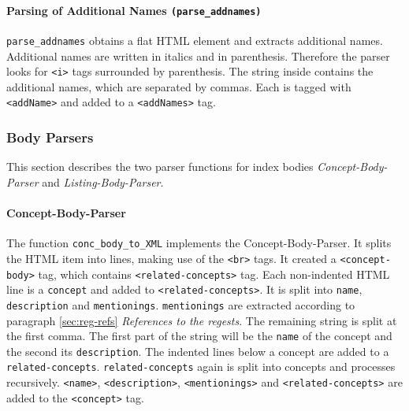 \paragraph{Parsing of Additional Names \texttt{(parse\_addnames)}}
\label{sec:addNames}
\texttt{parse\_addnames} obtains a flat HTML element and extracts
additional names. Additional names are written in italics and in
parenthesis. Therefore the parser looks for \texttt{<i>} tags
surrounded by parenthesis. The string inside contains the additional
names, which are separated by commas. Each is tagged with
\texttt{<addName>} and added to a \texttt{<addNames>} tag.


\subsubsection{Body Parsers}
This section describes the two parser functions for index bodies
\textit{Concept-Body-Parser} and \textit{Listing-Body-Parser}.

\paragraph{Concept-Body-Parser}
\label{sec:conc-body-parser}
The function \texttt{conc\_body\_to\_XML} implements the
Concept-Body-Parser. It splits the HTML item into lines, making use of
the \texttt{<br>} tags. It created a \texttt{<concept-body>} tag,
which contains \texttt{<related-concepts>} tag. Each non-indented HTML
line is a \texttt{concept} and added to \texttt{<related-concepts>}.
It is split into \texttt{name}, \texttt{description} and
\texttt{mentionings}. \texttt{mentionings} are extracted according to
paragraph \ref{sec:reg-refs} \textit{References to the regests}. The
remaining string is split at the first comma. The first part of the
string will be the \texttt{name} of the concept and the second its
\texttt{description}. The indented lines below a concept are added to
a \texttt{related-concepts}. \texttt{related-concepts} again is split
into concepts and processes recursively. \texttt{<name>},
\texttt{<description>}, \texttt{<mentionings>} and
\texttt{<related-concepts>} are added to the \texttt{<concept>} tag.

